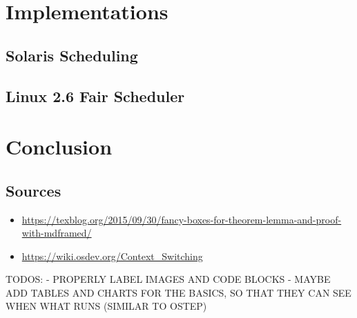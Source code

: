 \documentclass{report}
\begin{document}
\part{Implementations}

\chapter{Solaris Scheduling}

\chapter{Linux 2.6 Fair Scheduler}



\part{Conclusion}

\chapter*{Sources}

\begin{itemize}
    \item \url{https://texblog.org/2015/09/30/fancy-boxes-for-theorem-lemma-and-proof-with-mdframed/}
    \item \url{https://wiki.osdev.org/Context_Switching}
\end{itemize}


TODOS:
- PROPERLY LABEL IMAGES AND CODE BLOCKS
- MAYBE ADD TABLES AND CHARTS FOR THE BASICS, SO THAT THEY CAN SEE WHEN WHAT RUNS (SIMILAR TO OSTEP)
\end{document}
